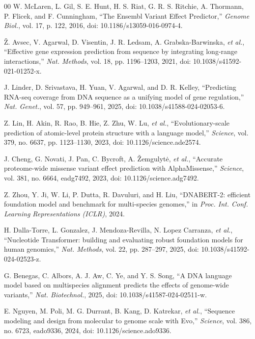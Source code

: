 \documentclass[conference,a4paper]{IEEEtran}
\begin{document}
\begin{thebibliography}{00}
 W. McLaren, L. Gil, S. E. Hunt, H. S. Riat, G. R. S. Ritchie, A. Thormann, P. Flicek, and F. Cunningham, ``The Ensembl Variant Effect Predictor,'' \textit{Genome Biol.}, vol. 17, p. 122, 2016, doi: 10.1186/s13059-016-0974-4.

 \v{Z}. Avsec, V. Agarwal, D. Visentin, J. R. Ledsam, A. Grabska-Barwinska, \emph{et al.}, ``Effective gene expression prediction from sequence by integrating long-range interactions,'' \textit{Nat. Methods}, vol. 18, pp. 1196--1203, 2021, doi: 10.1038/s41592-021-01252-x.

 J. Linder, D. Srivastava, H. Yuan, V. Agarwal, and D. R. Kelley, ``Predicting RNA-seq coverage from DNA sequence as a unifying model of gene regulation,'' \textit{Nat. Genet.}, vol. 57, pp. 949--961, 2025, doi: 10.1038/s41588-024-02053-6.

 Z. Lin, H. Akin, R. Rao, B. Hie, Z. Zhu, W. Lu, \emph{et al.}, ``Evolutionary-scale prediction of atomic-level protein structure with a language model,'' \textit{Science}, vol. 379, no. 6637, pp. 1123--1130, 2023, doi: 10.1126/science.ade2574.

 J. Cheng, G. Novati, J. Pan, C. Bycroft, A. \v{Z}emgulyt\.{e}, \emph{et al.}, ``Accurate proteome-wide missense variant effect prediction with AlphaMissense,'' \textit{Science}, vol. 381, no. 6664, eadg7492, 2023, doi: 10.1126/science.adg7492.

 Z. Zhou, Y. Ji, W. Li, P. Dutta, R. Davuluri, and H. Liu, ``DNABERT-2: efficient foundation model and benchmark for multi-species genomes,'' in \textit{Proc. Int. Conf. Learning Representations (ICLR)}, 2024.

 H. Dalla-Torre, L. Gonzalez, J. Mendoza-Revilla, N. Lopez Carranza, \emph{et al.}, ``Nucleotide Transformer: building and evaluating robust foundation models for human genomics,'' \textit{Nat. Methods}, vol. 22, pp. 287--297, 2025, doi: 10.1038/s41592-024-02523-z.

 G. Benegas, C. Albors, A. J. Aw, C. Ye, and Y. S. Song, ``A DNA language model based on multispecies alignment predicts the effects of genome-wide variants,'' \textit{Nat. Biotechnol.}, 2025, doi: 10.1038/s41587-024-02511-w.

 E. Nguyen, M. Poli, M. G. Durrant, B. Kang, D. Katrekar, \emph{et al.}, ``Sequence modeling and design from molecular to genome scale with Evo,'' \textit{Science}, vol. 386, no. 6723, eado9336, 2024, doi: 10.1126/science.ado9336.


\end{thebibliography}
\end{document}
